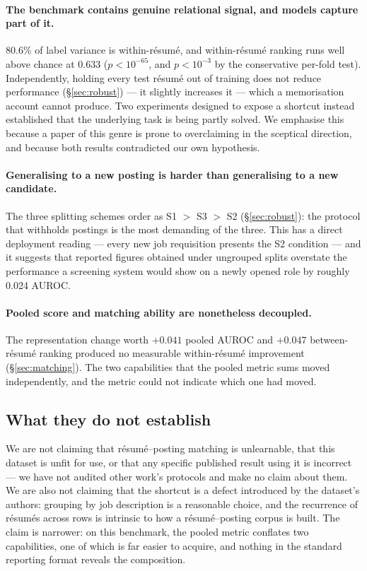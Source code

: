 \documentclass[11pt]{article}                      %
\begin{document}
\paragraph{The benchmark contains genuine relational signal, and models capture
part of it.}
80.6\% of label variance is within-résumé, and within-résumé ranking runs well
above chance at 0.633 ($p < 10^{-65}$, and $p < 10^{-3}$ by the conservative
per-fold test). Independently, holding every test résumé out of training does not
reduce performance (\S\ref{sec:robust}) --- it slightly increases it --- which a
memorisation account cannot produce. Two experiments designed to expose a
shortcut instead established that the underlying task is being partly solved. We
emphasise this because a paper of this genre is prone to overclaiming in the
sceptical direction, and because both results contradicted our own hypothesis.

\paragraph{Generalising to a new posting is harder than generalising to a new
candidate.}
The three splitting schemes order as S1 $>$ S3 $>$ S2 (\S\ref{sec:robust}): the
protocol that withholds postings is the most demanding of the three. This has a
direct deployment reading --- every new job requisition presents the S2 condition
--- and it suggests that reported figures obtained under ungrouped splits
overstate the performance a screening system would show on a newly opened role by
roughly 0.024 AUROC.

\paragraph{Pooled score and matching ability are nonetheless decoupled.}
The representation change worth $+0.041$ pooled AUROC and $+0.047$ between-résumé
ranking produced no measurable within-résumé improvement (\S\ref{sec:matching}).
The two capabilities that the pooled metric sums moved independently, and the
metric could not indicate which one had moved.

\subsection{What they do not establish}

We are not claiming that résumé--posting matching is unlearnable, that this
dataset is unfit for use, or that any specific published result using it is
incorrect --- we have not audited other work's protocols and make no claim about
them. We are also not claiming that the shortcut is a defect introduced by the
dataset's authors: grouping by job description is a reasonable choice, and the
recurrence of résumés across rows is intrinsic to how a résumé--posting corpus is
built. The claim is narrower: on this benchmark, the pooled metric conflates two
capabilities, one of which is far easier to acquire, and nothing in the standard
reporting format reveals the composition.
\end{document}
